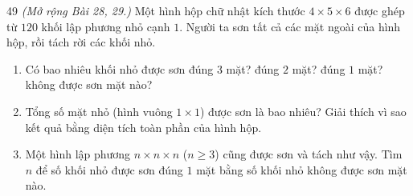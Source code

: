 \begin{probbox}{49}{}
\textit{(Mở rộng Bài 28, 29.)} Một hình hộp chữ nhật kích thước $4\times 5\times 6$ được ghép từ $120$ khối lập
phương nhỏ cạnh $1$. Người ta sơn tất cả các mặt ngoài của hình hộp, rồi tách rời các khối nhỏ.
\begin{enumerate}[label=\alph*),leftmargin=1.6em,itemsep=1pt]
\item Có bao nhiêu khối nhỏ được sơn đúng $3$ mặt? đúng $2$ mặt? đúng $1$ mặt? không được sơn mặt nào?
\item Tổng số mặt nhỏ (hình vuông $1\times 1$) được sơn là bao nhiêu? Giải thích vì sao kết quả bằng diện tích
toàn phần của hình hộp.
\item Một hình lập phương $n\times n\times n$ ($n\ge 3$) cũng được sơn và tách như vậy. Tìm $n$ để số khối nhỏ được
sơn đúng $1$ mặt bằng số khối nhỏ không được sơn mặt nào.
\end{enumerate}
\end{probbox}
